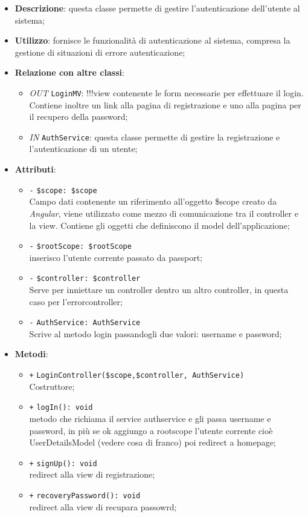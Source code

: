 \begin{itemize}
	\item \textbf{Descrizione}: questa classe permette di gestire l'autenticazione dell'utente al sistema; 
	\item \textbf{Utilizzo}: fornisce le funzionalità di autenticazione al sistema, compresa la gestione di situazioni di errore autenticazione;
	\item \textbf{Relazione con altre classi}:
	\begin{itemize}
		\item \textit{OUT} \texttt{LoginMV}: !!!view contenente le form necessarie per effettuare il login. Contiene inoltre un link alla pagina di registrazione e uno alla pagina per il recupero della password;
		\item \textit{IN} \texttt{AuthService}: questa classe permette di gestire la registrazione e l'autenticazione di un utente;
	\end{itemize}
	\item \textbf{Attributi}:
	\begin{itemize}
		\item \texttt{-} \texttt{\$scope: \$scope} \\
		Campo dati contenente un riferimento all’oggetto \$scope creato da \textit{Angular}, viene utilizzato come mezzo di comunicazione tra il controller e la view. Contiene gli oggetti che definiscono il model dell’applicazione;
		\item \texttt{-} \texttt{\$rootScope: \$rootScope} \\
		inserisco l'utente corrente passato da passport;
		\item \texttt{-} \texttt{\$controller: \$controller} \\
		Serve per inniettare un controller dentro un altro controller, in questa caso per l'errorcontroller;
		\item \texttt{-} \texttt{AuthService: AuthService} \\
		Scrive al metodo login passandogli due valori: username e password;
	\end{itemize}
	\item \textbf{Metodi}:
	\begin{itemize}
		\item \texttt{+} \texttt{LoginController(\$scope,\$controller, AuthService)} \\
		Costruttore;
		\item \texttt{+} \texttt{logIn(): void} \\
		metodo che richiama il service authservice e gli passa username e password, in più se ok aggiungo a rootscope l'utente corrente cioè UserDetailsModel (vedere cosa di franco) poi redirect a homepage;
		\item \texttt{+} \texttt{signUp(): void} \\
		redirect alla view di registrazione;
		\item \texttt{+} \texttt{recoveryPassword(): void} \\
		redirect alla view di recupara passowrd;
	\end{itemize}
\end{itemize}

